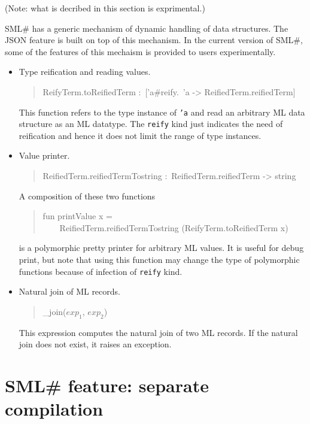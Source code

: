 \documentclass{jbook}
\newcommand{\txt}[2]{#2}
\newcommand{\smlsharp}{SML\#}
\newenvironment{program}{\begin{quote}\begin{tt}}%
                        {\end{tt}\end{quote}}
\begin{document}
\else%
	(Note: what is decribed in this section is exprimental.)

	\smlsharp{} has
a generic mechanism of dynamic handling of data structures.
	The JSON feature is built on top of this mechanism.
	In the current version of \smlsharp{},
some of the features of this mechaism is provided to users
experimentally.

\begin{itemize}
\item
	Type reification and reading values.
\begin{program}
ReifyTerm.toReifiedTerm :\ ['a\#reify.\ 'a -> ReifiedTerm.reifiedTerm]
\end{program}
	This function refers to the type instance of {\tt 'a}
and read an arbitrary ML data structure as an ML datatype.
	The {\tt reify} kind just indicates the need of reification
and hence it does not limit the range of type instances.

\item
	Value printer.
\begin{program}
ReifiedTerm.reifiedTermTostring :\ ReifiedTerm.reifiedTerm -> string
\end{program}

	A composition of these two functions
\begin{program}
fun printValue x =\\
\ \ \ \ ReifiedTerm.reifiedTermTostring (ReifyTerm.toReifiedTerm x)
\end{program}
is a polymorphic pretty printer for arbitrary ML values.
	It is useful for debug print,
but note that
using this function may change the type of polymorphic functions
because of infection of {\tt reify} kind.

\item
        Natural join of ML records.
\begin{program}
\_join($\mathit{exp}_1$, $\mathit{exp}_2$)
\end{program}
	This expression
computes the natural join of two ML records.
	If the natural join does not exist, it raises an exception.

\end{itemize}


\fi%


\chapter{
\txt{\smlsharp{}の拡張機能：\smlsharp{}分割コンパイルシステム}
    {\smlsharp{} feature: separate compilation}
}
\label{chap:tutorialSeparatecompilation}
\end{document}
